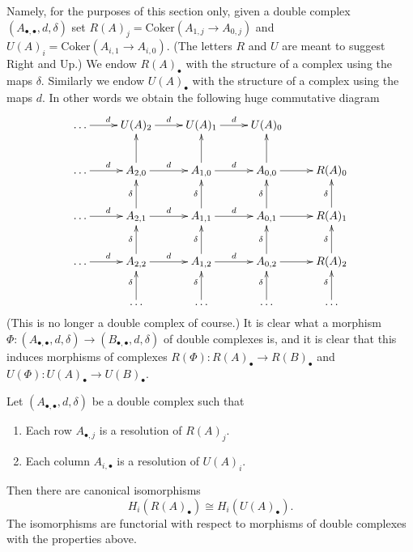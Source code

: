 \medskip\noindent
Namely, for the purposes of this section only, given a double
complex $(A_{\bullet, \bullet}, d, \delta)$ set
$R(A)_j = \text{Coker}(A_{1, j} \to A_{0, j})$ and
$U(A)_i = \text{Coker}(A_{i, 1} \to A_{i, 0})$. (The letters
$R$ and $U$ are meant to suggest Right and Up.)
We endow $R(A)_\bullet$ with the structure of a complex
using the maps $\delta$. Similarly we endow $U(A)_\bullet$
with the structure of a complex using the maps $d$.
In other words we obtain the following huge commutative diagram
$$
\xymatrix{
\ldots \ar[r]^d &
U(A)_2 \ar[r]^d &
U(A)_1 \ar[r]^d &
U(A)_0 &
\cr
\ldots \ar[r]^d &
A_{2, 0} \ar[r]^d \ar[u] &
A_{1, 0} \ar[r]^d \ar[u] &
A_{0, 0} \ar[r] \ar[u] &
R(A)_0 \cr
\ldots \ar[r]^d &
A_{2, 1} \ar[r]^d \ar[u]^\delta &
A_{1, 1} \ar[r]^d \ar[u]^\delta &
A_{0, 1} \ar[r] \ar[u]^\delta &
R(A)_1 \ar[u]^\delta \cr
\ldots \ar[r]^d &
A_{2, 2} \ar[r]^d \ar[u]^\delta &
A_{1, 2} \ar[r]^d \ar[u]^\delta &
A_{0, 2} \ar[r] \ar[u]^\delta &
R(A)_2 \ar[u]^\delta \cr
&
\ldots \ar[u]^\delta &
\ldots \ar[u]^\delta &
\ldots \ar[u]^\delta &
\ldots \ar[u]^\delta \cr
}
$$
(This is no longer a double complex of course.)
It is clear what a morphism $\Phi : (A_{\bullet, \bullet}, d, \delta)
\to (B_{\bullet, \bullet}, d, \delta)$ of double complexes
is, and it is clear that this induces morphisms of complexes
$R(\Phi) : R(A)_\bullet \to R(B)_\bullet$ and
$U(\Phi) : U(A)_\bullet \to U(B)_\bullet$.

\begin{lemma}
\label{lemma-no-spectral-sequence}
Let $(A_{\bullet, \bullet}, d, \delta)$ be a double complex such
that
\begin{enumerate}
\item Each row $A_{\bullet, j}$ is a resolution of $R(A)_j$.
\item Each column $A_{i, \bullet}$ is a resolution of $U(A)_i$.
\end{enumerate}
Then there are canonical isomorphisms
$$
H_i(R(A)_\bullet)
\cong
H_i(U(A)_\bullet).
$$
The isomorphisms are functorial with respect to morphisms
of double complexes with the properties above.
\end{lemma}


